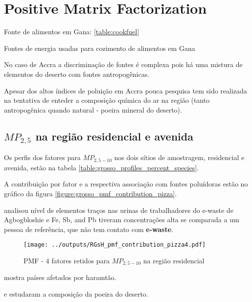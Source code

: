 \section{Positive Matrix Factorization}


Fonte de alimentos em Gana: \ref{table:cookfuel}
\begin{table}[H]
 \centering
  
  \caption{Fontes de energia usadas para cozimento de alimentos em 
           Gana \citep{ghanacensus2013} \label{table:cookfuel}}
\end{table}
No caso de Accra a discriminação de fontes é complexa pois
há uma mistura de elementos do deserto com fontes antropogênicas.

Apesar dos altos índices de poluição em Accra pouca pesquisa tem sido 
realizada na tentativa de enteder a composição química do ar na região
(tanto antropogênica quando natural - poeira mineral do deserto). 

\subsection{$MP_{2,5}$ na região residencial e avenida}

Os perfis dos fatores para $MP_{2,5-10}$ nos dois sítios de amostragem, 
residencial e avenida, estão na tabela \ref{table:grosso_profiles_percent_species}.

A contribuição por fator e a respectiva associação com fontes poluídoras
estão no gráfico da figura \ref{figure:grosso_pmf_contribution_pizza}. 

\citep{asante2012} analisou nível de elementos traços nas urinas de trabalhadores 
do e-waste de Agbogbloshie e Fe, Sb, and Pb tiveram concentrações alta se comparada
a um pessoa de referência, que não tem contato com \textbf{e-waste}.

\begin{figure}[H]
\begin{center}
  \texttt{[image: ../outputs/RGsH\_pmf\_contribution\_pizza4.pdf]}
  \caption{PMF - 4 fatores retidos para $MP_{2,5-10}$ na região residencial}
\end{center}
\end{figure}



\citep{kaku2016}


\citep{prospero2002} mostra países afetados por haramtão. 

\citep{engelbrecht2009a} e \citep{engelbrecht2009b} estudaram a composição 
da poeira do deserto.


